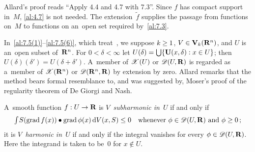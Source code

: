 \begin{remark}
    \label{rem:7.4}
    Allard's proof reads ``Apply 4.4 and 4.7 with 7.3''. Since $f$ has compact support in~$M$,
    \ref{al:4.7} is not needed. The extension~$\tilde f$ supplies the passage from functions
    on~$M$ to functions on an~open set required by~\ref{al:7.3}.
\end{remark}

\begin{miniremark}
    \label{mr:7.5}
    In~\ref{al:7.5(1)}--\ref{al:7.5(6)}, which treat~\cite[7.5]{Allard1972}, we suppose $k \ge
    1$, $V \in \mathbf{V}_{k}(\mathbf{R}^{n})$, and $U$ is an~open subset of~$\mathbf{R}^{n}$. For $0 < \delta <
    \infty$ let $U(\delta) = {{\textstyle \bigcup}} \{ \mathbf{U}(x,\delta) : x \in U \}$; then $U(\delta)(\delta') =
    U(\delta + \delta')$. A~member of $\mathscr{X}(U)$ or $\mathscr{D}(U,\mathbf{R})$ is regarded as a~member of
    $\mathscr{X}(\mathbf{R}^{n})$ or $\mathscr{D}(\mathbf{R}^{n},\mathbf{R})$ by extension by zero. Allard remarks that the
    method bears formal resemblance to, and was suggested by, Moser's proof of the regularity
    theorem of De Giorgi and Nash.
\end{miniremark}

\begin{definition}
    \label{al:7.5(1)}
    A~smooth function $f : U \to \mathbf{R}$ is \emph{$V$~subharmonic in~$U$} if and only if
    \begin{displaymath}
        {\textstyle\int_{}^{}} S(\operatorname{grad} f(x)) \bullet \operatorname{grad} \phi(x) \,\mathrm{d} V(x,S) \le 0 \quad \text{whenever
        $\phi \in \mathscr{D}(U,\mathbf{R})$ and $\phi \ge 0$} \,;
    \end{displaymath}
    it is \emph{$V$~harmonic in~$U$} if and only if the integral vanishes for every $\phi \in
    \mathscr{D}(U,\mathbf{R})$. Here the integrand is taken to be~$0$ for $x \notin U$.
\end{definition}

